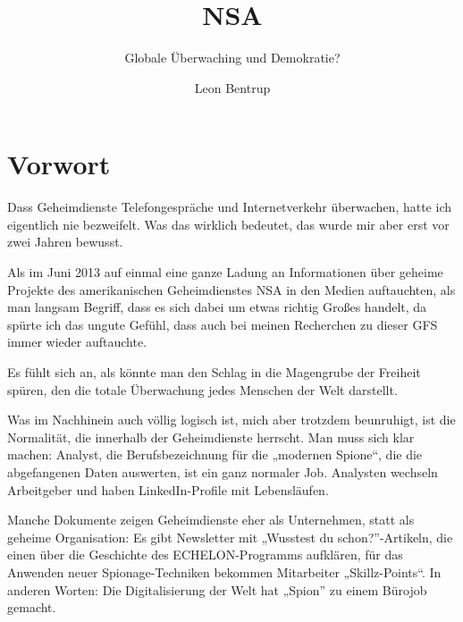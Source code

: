 \documentclass[12pt,a4paper]{scrartcl}
\author{Leon Bentrup}
\title{NSA}
\subtitle{Globale Überwaching und Demokratie?}
\begin{document}
\maketitle
\tableofcontents
\newpage
{}

\section{Vorwort}
Dass Geheimdienste Telefongespräche und Internetverkehr überwachen, hatte ich eigentlich nie bezweifelt. Was das wirklich bedeutet, das wurde mir aber erst vor zwei Jahren bewusst.

Als im Juni 2013 auf einmal eine ganze Ladung an Informationen über geheime Projekte des amerikanischen Geheimdienstes NSA in den Medien auftauchten, als man langsam Begriff, dass es sich dabei um etwas richtig Großes handelt, da spürte ich das ungute Gefühl, dass auch bei meinen Recherchen zu dieser GFS immer wieder auftauchte.

Es fühlt sich an, als könnte man den Schlag in die Magengrube der Freiheit spüren, den die totale Überwachung jedes Menschen der Welt darstellt.

Was im Nachhinein auch völlig logisch ist, mich aber trotzdem beunruhigt, ist die Normalität, die innerhalb der Geheimdienste herrscht. Man muss sich klar machen: Analyst, die Berufsbezeichnung für die „modernen Spione“, die die abgefangenen Daten auswerten, ist ein ganz normaler Job. Analysten wechseln Arbeitgeber und haben LinkedIn-Profile mit Lebensläufen.

Manche Dokumente zeigen Geheimdienste eher als Unternehmen, statt als geheime Organisation: Es gibt Newsletter mit „Wusstest du schon?”-Artikeln, die einen über die Geschichte des ECHELON-Programms aufklären, für das Anwenden neuer Spionage-Techniken bekommen Mitarbeiter „Skillz-Points“. In anderen Worten: Die Digitalisierung der Welt hat „Spion” zu einem Bürojob gemacht.
\end{document}
